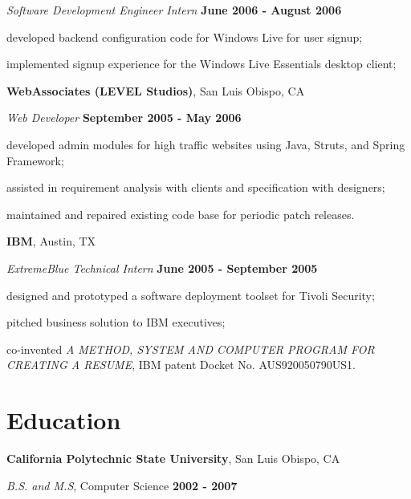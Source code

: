 \documentclass[margin,line]{res}
\newenvironment{list1}{
  \begin{list}{\ding{113}}{%
      \setlength{\itemsep}{0in}
      \setlength{\parsep}{0in} \setlength{\parskip}{0in}
      \setlength{\topsep}{0in} \setlength{\partopsep}{0in} 
      \setlength{\leftmargin}{0.17in}}}{\end{list}}
\begin{document}
\begin{resume}
\vspace{-.3cm}
{\em Software Development Engineer Intern} \hfill {\small \bf June 2006 - August 2006}
\begin{list1}
\item[] developed backend configuration code for Windows Live for user signup;
\item[] implemented signup experience for the Windows Live Essentials desktop client;
\end{list1}

{\bf WebAssociates (LEVEL Studios)}, San Luis Obispo, CA

\vspace{-.3cm}
{\em Web Developer} \hfill {\small \bf September 2005 - May 2006}
\begin{list1}
\item[] developed admin modules for high traffic websites using Java, Struts, and Spring Framework;
\item[] assisted in requirement analysis with clients and specification with designers;
\item[] maintained and repaired existing code base for periodic patch releases.
\end{list1}

{\bf IBM}, Austin, TX

\vspace{-.3cm}
{\em ExtremeBlue Technical Intern} \hfill {\small \bf June 2005 - September 2005}
\begin{list1}
\item[] designed and prototyped a software deployment toolset for Tivoli Security;
\item[] pitched business solution to IBM executives;
\item[] co-invented {\em A METHOD, SYSTEM AND COMPUTER PROGRAM FOR CREATING A RESUME}, IBM patent Docket No. AUS920050790US1.
\end{list1}	

\section{\sc \large Education}
{\bf California Polytechnic State University}, San Luis Obispo, CA

\vspace{-.3cm}
{\em B.S. and M.S}, Computer Science \hfill {\small \bf 2002 - 2007}
\begin{list1}
\item[] 
\end{list1}


\end{resume}
\end{document}
